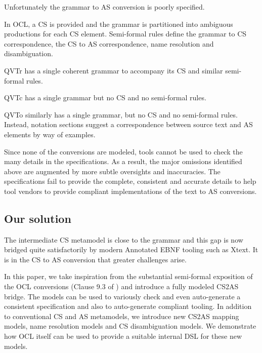 \documentclass{llncs}
\begin{document}
Unfortunately the grammar to AS conversion is poorly specified.

In OCL, a CS is provided and the grammar is partitioned into ambiguous productions for each CS element. Semi-formal rules define the grammar to CS correspondence, the CS to AS correspondence, name resolution and disambiguation.

QVTr has a single coherent grammar to accompany its CS and similar semi-formal rules.

QVTc has a single grammar but no CS and no semi-formal rules.

QVTo similarly has a single grammar, but no CS and no semi-formal rules. Instead, notation sections suggest a correspondence between source text and AS elements by way of examples. 

Since none of the conversions are modeled, tools cannot be used to check the many details in the specifications. As a result, the major omissions identified above are augmented by more subtle oversights and inaccuracies. The specifications fail to provide the complete, consistent and accurate details to help tool vendors to provide compliant implementations of the text to AS conversions. 


\subsection{Our solution}

The intermediate CS metamodel is close to the grammar and this gap is now bridged quite satisfactorily by modern Annotated EBNF tooling such as Xtext. It is in the CS to AS conversion that greater challenges arise. 

In this paper, we take inspiration from the substantial semi-formal exposition of the OCL conversions (Clause 9.3 of \cite{omg2013ocl}) and introduce a fully modeled CS2AS bridge. The models can be used to variously check and even auto-generate a consistent specification and also to auto-generate compliant tooling. In addition to conventional CS and AS metamodels, we introduce new CS2AS mapping models, name resolution models and CS disambiguation models. We demonstrate how OCL itself can be used to provide a suitable internal DSL for these new models.
\end{document}
